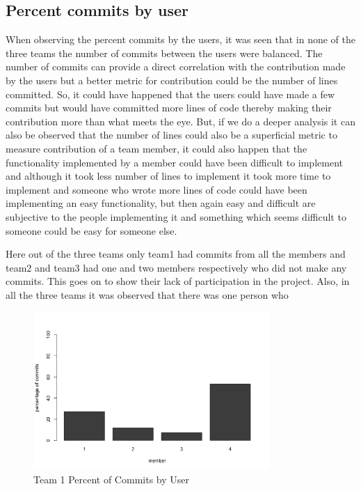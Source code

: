 \documentclass[conference]{IEEEtran}
\begin{document}
\subsection{Percent commits by user}
When observing the percent commits by the users, it was seen that in none of the three teams the number of commits between the users were balanced. The number of commits can provide a direct correlation with the contribution made by the users but a better metric for contribution could be the number of lines committed. So, it could have happened that the users could have made a few commits but would have committed more lines of code thereby making their contribution more than what meets the eye. But, if we do a deeper analysis it can also be observed that the number of lines could also be a superficial metric to measure contribution of a team member, it could also happen that the functionality implemented by a member could have been difficult to implement and although it took less number of lines to implement it took more time to implement and someone who wrote more lines of code could have been implementing an easy functionality, but then again easy and difficult are subjective to the people implementing it and something which seems difficult to someone could be easy for someone else. 

Here out of the three teams only team1 had commits from all the members and team2 and team3 had one and two members respectively who did not make any commits. This goes on to show their lack of participation in the project. Also, in all the three teams it was observed that there was one person who 


\begin{figure}[H]
    \centering
    \includegraphics[width=9cm]{../AprilProject/pic/users commit percentage team1.png}
    \caption{Team 1 Percent of Commits by User}
    \label{team1_percent_commit}
\end{figure}
\end{document}
